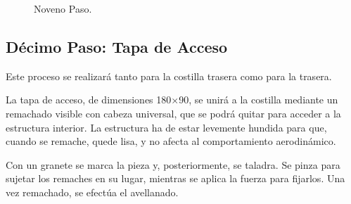 \begin{figure}[!htb]
\centering
{}
\caption{Noveno Paso. \label{fig:nov}}
\end{figure}
\pagebreak
\subsection{Décimo Paso: Tapa de Acceso}
Este proceso se realizará tanto para la costilla trasera como para la trasera.

La tapa de acceso, de dimensiones 180$\times$90, se unirá a la costilla mediante un remachado visible con cabeza universal, que se podrá quitar para acceder a la estructura interior. La estructura ha de estar levemente hundida para que, cuando se remache, quede lisa, y no afecta al comportamiento aerodinámico.

Con un granete se marca la pieza y, posteriormente, se taladra. Se pinza para sujetar los remaches en su lugar, mientras se aplica la fuerza para fijarlos. Una vez remachado, se efectúa el avellanado.

